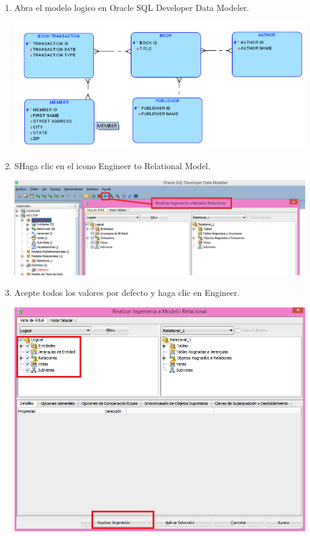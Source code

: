 \documentclass[12pt,letterpaper]{article}
\begin{document}
\begin{enumerate}[1.]
    \item  Abra el modelo logico en Oracle SQL Developer Data Modeler.
    
    \includegraphics[width=15cm]{./soniaImagen/diagrama2.png} 
     
    \item SHaga clic en el icono Engineer to Relational Model.
    
   \includegraphics[width=15cm]{./soniaImagen/diagrama3.png} 
    
    \item Acepte todos los valores por defecto y haga clic en Engineer.
    
      \includegraphics[width=15cm]{./soniaImagen/diagrama4.png}  
    

\end{enumerate}
\end{document}

